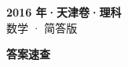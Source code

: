 \documentclass[zihao=-4, a4paper]{ctexart}
\begin{document}
\begin{center}
  {\Large\bfseries 2016 年·天津卷·理科}\\[4pt]
  {\large 数学 · 简答版}
\end{center}
\medskip
{}

\clearpage
{}
\begin{center}{\Large\bfseries 答案速查}\end{center}
\medskip

\end{document}
